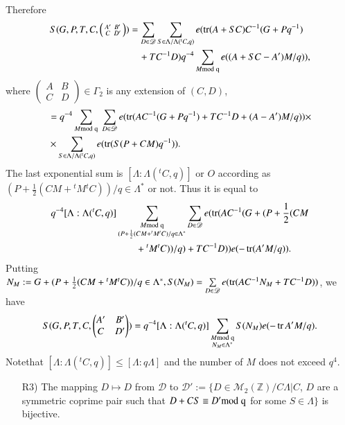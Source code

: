 Therefore 
\begin{align*}
S(G,P,T,C,\left(\begin{smallmatrix} A' & B'\\ C & D'
\end{smallmatrix}\right))&=\sum_{D\in\mathscr{D}}\sum_{S\in\Lambda/\Lambda({}^{t}C,q)}e(\operatorname{tr}(A+SC)C^{-1}(G+Pq^{-1})\\
&\quad+TC^{-1}D)q^{-4}\sum_{M\rm{mod} \; 
  q}e((A+SC - A')M/q)), 
\end{align*}
where $\left(\begin{smallmatrix} A & B\\ C & D 
\end{smallmatrix}\right)\in \Gamma_{2}$ is any extension of $(C,D)$,
\begin{align*}
& = q^{-4}\sum_{M\rm{mod}\;
    q} \; \sum_{D\in\mathscr{D}}e(\operatorname{tr}(AC^{-1}(G+Pq^{-1})+TC^{-1}D+(A-A')M/q))\times\\
&\times \sum_{S\in\Lambda/\Lambda({}^{t}C,q)}e(\operatorname{tr}(S(P+CM)q^{-1})).
\end{align*}
The last exponential sum is $[\Lambda:\Lambda({}^{t}C,q)]$ or $O$
according as $(P+\frac{1}{2}(CM+{}^{t}M{}^{t}C))/q\in\Lambda^{\ast}$
or not. Thus it is equal to
\begin{align*}
q^{-4}[\Lambda:\Lambda({}^{t}C,q)]&\sum_{\substack{M\rm{mod} \;
    q\\ (P+\frac{1}{2}(CM+{}^{t}M{}^{t}C)/q\in\Lambda^{\ast}}}\sum_{D\in\mathscr{D}}
e(\operatorname{tr}(AC^{-1}(G+(P+\frac{1}{2}(CM\\
&\qquad+{}^{t}M{}^{t}C))/q)+TC^{-1}D))e(-\operatorname{tr}(A'M/q)).
\end{align*}
Putting
$N_{M}:=G+(P+\frac{1}{2}(CM+{}^{t}M{}^{t}C))/q\in\Lambda^{\ast},
S(N_{M})=\sum\limits_{D\in\mathscr{D}}\break e(\tr(AC^{-1}N_{M}+TC^{-1}D))$,
we have
$$
S(G,P,T,C,
\begin{pmatrix}
A' & B'\\
C & D'
\end{pmatrix}
)
=q^{-4}[\Lambda:\Lambda({}^{t}C,q)]\sum_{\substack{M\rm{mod} \;
    q\\ N_{M}\in\Lambda^{\ast}}}S(N_{M})e(-\operatorname{tr} A'M/q).
$$
Note\pageoriginale that $[\Lambda:\Lambda({}^{t}C,q)]\leq
[\Lambda:q\Lambda]$ and the number of $M$ does not exceed $q^{4}$.
\begin{itemize}
\item[R3)] The mapping $D\mapsto D$ from $\mathscr{D}$ to
  $\mathscr{D}':=\{D\in\mathscr{M}_{2}(\mathbb{Z})/C\Lambda|C$, $D$
  are a symmetric coprime pair such that $D+CS\equiv D'\rm{mod} \; q$ for
  some $S\in\Lambda\}$ is bijective.
\end{itemize}

